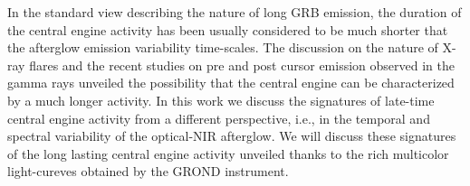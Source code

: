 


\bigskip



\bigskip

\noindent In the standard view describing the nature of long GRB emission, the duration of the central engine activity has been usually considered to be 
much shorter that the afterglow emission variability time-scales.
The discussion on the nature of X-ray flares and the recent studies on pre and post cursor emission observed in the gamma rays unveiled the possibility that the central engine can be characterized by a much longer activity. In this work we discuss the signatures of late-time central engine activity from a different perspective, i.e., in the temporal and spectral variability of the optical-NIR afterglow. We will discuss these signatures of the long lasting central engine activity unveiled thanks to the rich multicolor light-cureves obtained by the GROND instrument.
